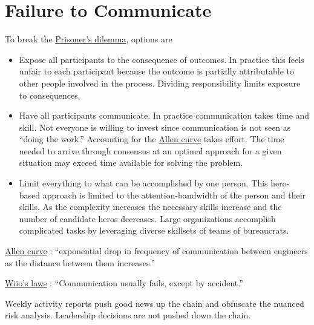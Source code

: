 \section{Failure to Communicate\label{sec:failure-to-comm}}

To break the \href{https://en.wikipedia.org/wiki/Prisoner\%27s\_dilemma}{Prisoner's dilemma}, options are 
\begin{itemize}
    \item Expose all participants to the consequence of outcomes. In practice this feels unfair to each participant because the outcome is partially attributable to other people involved in the process. Dividing responsibility limits exposure to consequences.
    \item Have all participants communicate. In practice communication takes time and skill. Not everyone is willing to invest since communication is not seen as ``doing the work.'' Accounting for the \href{https://en.wikipedia.org/wiki/Allen\_curve}{Allen curve} takes effort. The time needed to arrive through consensus at an optimal approach for a given situation may exceed time available for solving the problem.
    \item Limit everything to what can be accomplished by one person. This hero-based approach is limited to the attention-bandwidth of the person and their skills. As the complexity increases the necessary skills increase and the number of candidate heros decreases. Large organizations accomplish complicated tasks by leveraging diverse skillsets of teams of bureaucrats.

\end{itemize}


 
 
\href{https://en.wikipedia.org/wiki/Allen_curve}{Allen curve}
: 
``exponential drop in frequency of communication between engineers as the distance between them increases.''

\href{https://en.wikipedia.org/wiki/Wiio\%27s_laws}{Wiio's laws}
: 
``Communication usually fails, except by accident.''


Weekly activity reports push good news up the chain and obfuscate the nuanced risk analysis. 
Leadership decisions are not pushed down the chain.

